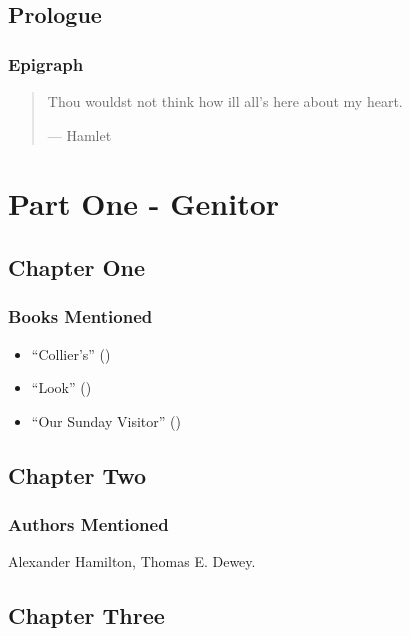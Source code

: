 \documentclass[
]{article}
\providecommand{\tightlist}{%
  \setlength{\itemsep}{0pt}\setlength{\parskip}{0pt}}
\begin{document}
\subsection{Prologue}\label{prologue}

\subsubsection{Epigraph}\label{epigraph}

\begin{quote}
Thou wouldst not think how ill all's here about my heart.

--- Hamlet
\end{quote}

\newpage

\section{Part One - Genitor}\label{part-one---genitor}

\subsection{Chapter One}\label{chapter-one}

\subsubsection{Books Mentioned}\label{books-mentioned}

\begin{itemize}
\tightlist
\item
  {``Collier's''} ()
\item
  {``Look''} ()
\item
  {``Our Sunday Visitor''} ()
\end{itemize}

\subsection{Chapter Two}\label{chapter-two}

\subsubsection{Authors Mentioned}\label{authors-mentioned-1}

Alexander Hamilton, Thomas E. Dewey.

\subsection{Chapter Three}\label{chapter-three}
\end{document}
